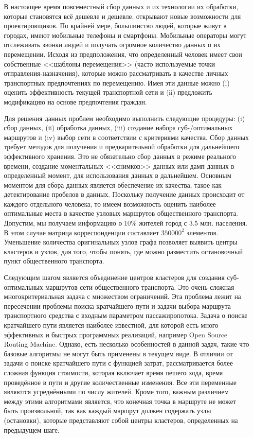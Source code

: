 В настоящее время повсеместный сбор данных и их технологии их обработки, которые становятся всё дешевле и 
дешевле, открывают новые возможности для проектировщиков. По крайней мере, большинство людей, которые 
живут в городах, имеют мобильные телефоны и смартфоны. Мобильные операторы могут отслеживать звонки людей 
и получать огромное количество данных о их перемещении. Исходя из предположения, что определенный человек 
имеет свои собственные <<шаблоны перемещения>> (часто используемые точки отправления-назначения), которые 
можно рассматривать в качестве личных транспортных предпочтениях по перемещению. Имея эти данные можно (i) 
оценить эффективность текущей транспортной сети и (ii) предложить модификацию на основе предпочтения 
граждан.

Для решения данных проблем необходимо выполнить следующие процедуры: (i) сбор данных, (ii) обработка данных, 
(iii) создание набора суб-/оптимальных маршрутов и (iv) выбор сети в соответствии с критериями качества.
Сбор данных требует методов для получения и предварительной обработки для дальнейшего эффективного хранения.
Это не обязательно сбор данных в режиме реального времени, создание моментальных <<снимков>> данных или 
дамп данных в определенный момент, для использования данных в дальнейшем. Основным моментом для сбора 
данных является обеспечение их качества, такое как детектирование пробелов в данных. Поскольку получение 
данных происходит от каждого отдельного человека, то имеем возможность оценить наиболее оптимальные места в 
качестве узловых маршрутов общественного транспорта. Допустим, мы получаем информацию о 10\% жителей город 
с 3.5 млн. населения. В этом случае матрица корреспонденции составляет \( 350 000^2 \) элементов. Уменьшение 
количества оригинальных узлов графа позволяет выявить центры кластеров и узлов, для того, чтобы понять, где 
можно разместить остановочный пункт общественного транспорта.

Следующим шагом является объединение центров кластеров для создания суб- оптимальных маршрутов сети 
общественного транспорта. Это очень сложная многокритериальная задача с множеством ограничений. Эта проблема 
лежит на пересечении проблемы поиска кратчайшего пути и задачи выбора маршрута транспортного средства с 
входным параметром пассажиропотока. Задача о поиске кратчайшего пути является наиболее известной, для которой 
есть много эффективных и быстрых программных реализаций, например Open Source Routing Machine\cite{osrm}. 
Однако, есть несколько особенностей в данной задач, такие что базовые алгоритмы не могут быть применены в 
текущем виде. В отличии от задачи о поиске кратчайшего пути с функцией затрат, рассматривается более сложная 
функция стоимости, которая включает время пешего хода, время проведённое в пути и другие количественные 
изменения. Все эти переменные являются усреднёнными по числу жителей. Кроме того, важным различием между этими 
алгоритмами является, что конечная точка в маршруте не может быть произвольной, так как каждый маршрут должен 
содержать узлы (остановки), которые представляют собой центры кластеров, определенных на предыдущем шаге.

